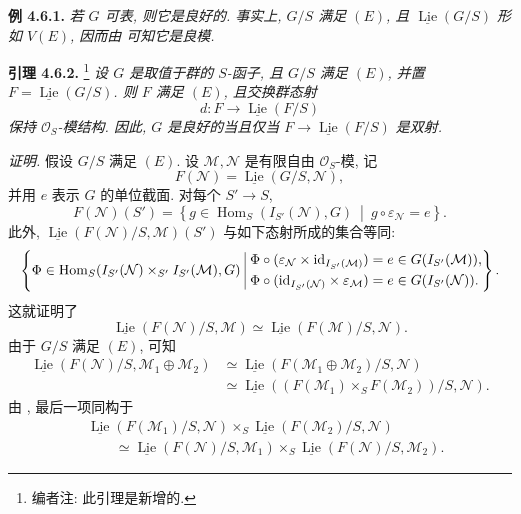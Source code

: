 \medskip
\noindent{}\textbf{例 4.6.1.}
\textit{若 \(G\) 可表, 则它是良好的. 事实上, \(G/S\)
满足 \((E)\), 且 \(\underline{\operatorname{Lie}}(G/S)\) 形如
\(V(E)\), 因而由  可知它是良模.}

\medskip
\noindent{}\textbf{引理 4.6.2.}
\footnote{编者注: 此引理是新增的.}
\textit{设 \(G\) 是取值于群的 \(S\)-函子, 且 \(G/S\)
满足 \((E)\), 并置
\(F=\underline{\operatorname{Lie}}(G/S)\). 则 \(F\) 满足
\((E)\), 且交换群态射}
\[
 d:F\longrightarrow\underline{\operatorname{Lie}}(F/S)
\]
\textit{保持 \(\mathcal O_S\)-模结构. 因此, \(G\) 是良好的当且仅当
\(F\to\underline{\operatorname{Lie}}(F/S)\) 是双射.}

\textit{证明.}
假设 \(G/S\) 满足 \((E)\). 设
\(\mathcal M,\mathcal N\) 是有限自由 \(\mathcal O_S\)-模, 记
\[
 F(\mathcal N)=\underline{\operatorname{Lie}}(G/S,\mathcal N),
\]
并用 \(e\) 表示 \(G\) 的单位截面. 对每个 \(S'\to S\),
\[
 F(\mathcal N)(S')
 =
 \left\{
  g\in\operatorname{Hom}_S(I_{S'}(\mathcal N),G)
  \ \middle|\ g\circ\varepsilon_{\mathcal N}=e
 \right\}.
\]
此外,
\(\underline{\operatorname{Lie}}(F(\mathcal N)/S,\mathcal M)(S')\)
与如下态射所成的集合等同:
\[
\left\{
\begin{array}{@{}l@{\ }|@{\ }l@{}}
 \Phi\in
 \operatorname{Hom}_S
   (I_{S'}(\mathcal N)\times_{S'}I_{S'}(\mathcal M),G)
 &
 \begin{aligned}
 \Phi\circ
  (\varepsilon_{\mathcal N}\times
   \mathrm{id}_{I_{S'}(\mathcal M)})
   &=e\in G(I_{S'}(\mathcal M)),\\
 \Phi\circ
  (\mathrm{id}_{I_{S'}(\mathcal N)}\times
   \varepsilon_{\mathcal M})
   &=e\in G(I_{S'}(\mathcal N)).
 \end{aligned}
\end{array}
\right\}.
\]
这就证明了
\begin{equation*}
 \underline{\operatorname{Lie}}(F(\mathcal N)/S,\mathcal M)
 \simeq
 \underline{\operatorname{Lie}}(F(\mathcal M)/S,\mathcal N).
 \tag{1}\label{sga3:ii:lemma:4-6-2:equation:1}
\end{equation*}
由于 \(G/S\) 满足 \((E)\), 可知
\[
\begin{aligned}
 \underline{\operatorname{Lie}}
   (F(\mathcal N)/S,\mathcal M_1\oplus\mathcal M_2)
 &\simeq
 \underline{\operatorname{Lie}}
   (F(\mathcal M_1\oplus\mathcal M_2)/S,\mathcal N)\\
 &\simeq
 \underline{\operatorname{Lie}}
   ((F(\mathcal M_1)\times_SF(\mathcal M_2))/S,\mathcal N).
\end{aligned}
\]
由 , 最后一项同构于
\[
\begin{aligned}
 &\underline{\operatorname{Lie}}(F(\mathcal M_1)/S,\mathcal N)
 \times_S
 \underline{\operatorname{Lie}}(F(\mathcal M_2)/S,\mathcal N)\\
 &\qquad\simeq
 \underline{\operatorname{Lie}}(F(\mathcal N)/S,\mathcal M_1)
 \times_S
 \underline{\operatorname{Lie}}(F(\mathcal N)/S,\mathcal M_2).
\end{aligned}
\]

